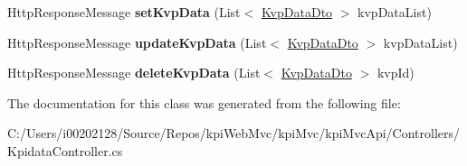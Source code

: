 \begin{DoxyCompactItemize}
Http\+Response\+Message {\bfseries set\+Kvp\+Data} (List$<$ \hyperlink{classkpi_mvc_api_1_1_data_transfer_objects_1_1_kvp_data_dto}{Kvp\+Data\+Dto} $>$ kvp\+Data\+List)
\item 
\mbox{\label{classkpi_mvc_api_1_1_controllers_1_1_kpidata_controller_ac165b3dedfa1744a41af6a1acc07a657}} 
Http\+Response\+Message {\bfseries update\+Kvp\+Data} (List$<$ \hyperlink{classkpi_mvc_api_1_1_data_transfer_objects_1_1_kvp_data_dto}{Kvp\+Data\+Dto} $>$ kvp\+Data\+List)
\item 
\mbox{\label{classkpi_mvc_api_1_1_controllers_1_1_kpidata_controller_a42bfeef2bf903c70d9d8452367ed6dd0}} 
Http\+Response\+Message {\bfseries delete\+Kvp\+Data} (List$<$ \hyperlink{classkpi_mvc_api_1_1_data_transfer_objects_1_1_kvp_data_dto}{Kvp\+Data\+Dto} $>$ kvp\+Id)
\end{DoxyCompactItemize}


The documentation for this class was generated from the following file\+:\begin{DoxyCompactItemize}
\item 
C\+:/\+Users/i00202128/\+Source/\+Repos/kpi\+Web\+Mvc/kpi\+Mvc/kpi\+Mvc\+Api/\+Controllers/Kpidata\+Controller.\+cs\end{DoxyCompactItemize}
